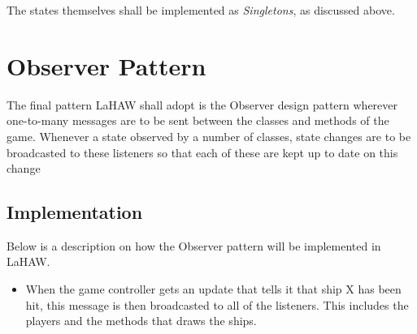         The states themselves shall be implemented as \emph{Singletons}, as discussed above.
    
    
    
    \section{Observer Pattern}
    The final pattern LaHAW shall adopt is the Observer design pattern wherever one-to-many messages are to be sent between the classes and methods of the game. Whenever a state observed by a number of classes, state changes are to be broadcasted to these listeners so that each of these are kept up to date on this change
    
        \subsection{Implementation}    
        Below is a description on how the Observer pattern will be implemented in LaHAW.
    
        \begin{itemize}
            \item When the game controller gets an update that tells it that ship X has been hit, this message is then broadcasted to all of the listeners. This includes the players and the methods that draws the ships.
        \end{itemize}
    

    